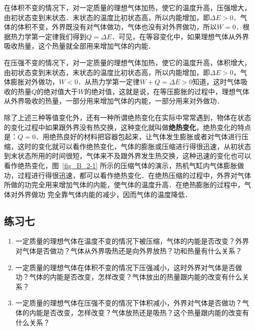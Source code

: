 在体积不变的情况下，对一定质量的理想气体加热，使它的温度升高，压强增大，由初状态变到末状态．末状态的温度比初状态高，所以内能增加，即$\Delta E>0$．气体的体积不变，外界既没有对气体做功，气体也没有对外界做功，所以$W=0$．根据热力学第一定律我们得到$Q=\Delta E$．可见，在等容变化中，如果理想气体从外界吸收热量，这个热量就全部用来增加气体的内能．

在压强不变的情况下，对一定质量的理想气体加热，使它的温度升高，体积增大，由初状态变到末状态，末状态的温度比初状态高，所以内能增加，即$\Delta E>0$，气体膨胀对外做功，$W<0$．从热力学第一定律$W+Q=\Delta E>0$知道，这时气体吸收的热量$Q$的绝对值大于$W$的绝对值，这就是说，在等压膨胀的过程中，理想气体从外界吸收的热量，一部分用来增加气体的内能，一部分用来对外做功．

除了上述三种等值变化外，还有一种所谓绝热变化在实际中常常遇到，物体在状态的变化过程中如果跟外界没有热交换，这种变化就叫做\textbf{绝热变化}，绝热变化的特点是：$Q=0$．用绝热良好的材料把容器包起来，让气体发生膨胀或者对气体进行压缩，这时的变化就可以看作绝热变化，气体的膨胀或压缩进行得很迅速，从初状态到末状态所用的时间很短，气体来不及跟外界发生热交换，这种迅速的变化也可以看作绝热变化，图~\ref{fig_B_2-1} 所示的压缩气体的演示，热机气缸内气体膨胀做功，过程进行得很迅速，都可以看作绝热变化．在绝热压缩的过程中，外界对气体所做的功完全用来增加气体的内能，使气体的温度升高．在绝热膨胀的过程中，气体对外界做功
完全靠气体内能的减少，因而气体的温度降低．


\subsection*{练习七}
\begin{enumerate}
    \item 一定质量的理想气体在温度不变的情况下被压缩，气体的内能是否改变？外界对气体是否做功？气体从外界吸热还是向外界放热？功和热量有什么关系？
\item 一定质量的理想气体在体积不变的情况下压强减小，这时外界对气体是否做功？气体的内能是否改变，怎样改变？气体放出的热量跟内能的改变有什么关系？
\item 一定质量的理想气体在压强不变的情况下体积减小，外界对气体是否做功？气体的内能是否改变，怎样改变？气体放热还是吸热？这个热量跟内能的改变有什么关系？
\end{enumerate}


